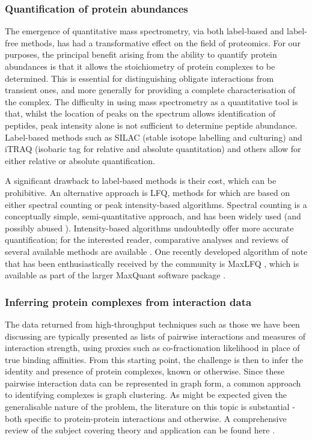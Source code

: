 \documentclass[a4paper,11pt,twoside,openright]{scrbook}
\begin{document}
\subsubsection{Quantification of protein abundances}
The emergence of quantitative mass spectrometry, via both label-based and label-free methods, has had a transformative effect on the field of proteomics. For our purposes, the principal benefit arising from the ability to quantify protein abundances is that it allows the stoichiometry of protein complexes to be determined. This is essential for distinguishing obligate interactions from transient ones, and more generally for providing a complete characterisation of the complex. The difficulty in using mass spectrometry as a quantitative tool is that, whilst the location of peaks on the spectrum allows identification of peptides, peak intensity alone is not sufficient to determine peptide abundance. Label-based methods such as SILAC \cite{Ong2002a} (stable isotope labelling and culturing) and iTRAQ \cite{Ross2004} (isobaric tag for relative and absolute quantitation) and others \cite{Gygi1999,Thompson2003} allow for either relative or absolute quantification.

A significant drawback to label-based methods is their cost, which can be prohibitive. An alternative approach is LFQ, methods for which are based on either spectral counting \cite{Liu2004,Zybailov2005} or peak intensity-based algorithms. Spectral counting is a conceptually simple, semi-quantitative approach, and has been widely used (and possibly abused \cite{Lundgren2010}). Intensity-based algorithms undoubtedly offer more accurate quantification; for the interested reader, comparative analyses and reviews of several available methods are available \cite{Nahnsen2013,Fabre2014}. One recently developed algorithm of note that has been enthusiastically received by the community is MaxLFQ \cite{Cox2014}, which is available as part of the larger MaxQuant software package \cite{Cox2008}.

\subsubsection{Inferring protein complexes from interaction data}
The data returned from high-throughput techniques such as those we have been discussing are typically presented as lists of pairwise interactions and measures of interaction strength, using proxies such as co-fractionation likelihood in place of true binding affinities. From this starting point, the challenge is then to infer the identity and presence of protein complexes, known or otherwise. Since these pairwise interaction data can be represented in graph form, a common approach to identifying complexes is graph clustering. As might be expected given the generalisable nature of the problem, the literature on this topic is substantial - both specific to protein-protein interactions and otherwise. A comprehensive review of the subject covering theory and application can be found here \cite{Schaeffer2007}.
\end{document}
